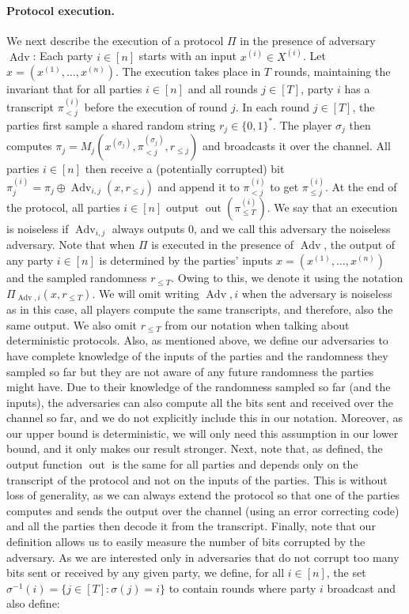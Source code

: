 \documentclass[10pt,a4paper]{article}
\begin{document}
\paragraph{Protocol execution.} We next describe the execution of a protocol $\Pi$ in the presence of adversary $\operatorname{Adv}$: Each party $i\in[n]$ starts with an input $x^{(i)}\in X^{(i)}$. Let $x=(x^{(1)},\ldots,x^{(n)})$. The execution takes place in $T$ rounds, maintaining the invariant that for all parties $i\in[n]$ and all rounds $j\in[T]$, party $i$ has a transcript $\pi_{<j}^{(i)}$ before the execution of round $j$. In each round $j\in[T]$, the parties first sample a shared random string $r_j\in\{0,1\}^*$. The player $\sigma_j$ then computes $\pi_j=M_j(x^{(\sigma_j)},\pi_{<j}^{(\sigma_j)},r_{\le j})$ and broadcasts it over the channel. All parties $i\in[n]$ then receive a (potentially corrupted) bit $\pi_j^{(i)}=\pi_j\oplus\operatorname{Adv}_{i,j}(x,r_{\le j})$ and append it to $\pi_{<j}^{(i)}$ to get $\pi_{\le j}^{(i)}$. At the end of the protocol, all parties $i\in[n]$ output $\operatorname{out}(\pi_{\le T}^{(i)})$. We say that an execution is noiseless if $\operatorname{Adv}_{i,j}$ always outputs 0, and we call this adversary the noiseless adversary.
Note that when $\Pi$ is executed in the presence of $\operatorname{Adv}$, the output of any party $i\in[n]$ is determined by the parties' inputs $x=(x^{(1)},\ldots,x^{(n)})$ and the sampled randomness $r_{\le T}$. Owing to this, we denote it using the notation $\Pi_{\operatorname{Adv},i}(x,r_{\le T})$. We will omit writing $\operatorname{Adv},i$ when the adversary is noiseless as in this case, all players compute the same transcripts, and therefore, also the same output. We also omit $r_{\le T}$ from our notation when talking about deterministic protocols. Also, as mentioned above, we define our adversaries to have complete knowledge of the inputs of the parties and the randomness they sampled so far but they are not aware of any future randomness the parties might have. Due to their knowledge of the randomness sampled so far (and the inputs), the adversaries can also compute all the bits sent and received over the channel so far, and we do not explicitly include this in our notation. Moreover, as our upper bound is deterministic, we will only need this assumption in our lower bound, and it only makes our result stronger.
Next, note that, as defined, the output function $\operatorname{out}$ is the same for all parties and depends only on the transcript of the protocol and not on the inputs of the parties. This is without loss of generality, as we can always extend the protocol so that one of the parties computes and sends the output over the channel (using an error correcting code) and all the parties then decode it from the transcript. Finally, note that our definition allows us to easily measure the number of bits corrupted by the adversary. As we are interested only in adversaries that do not corrupt too many bits sent or received by any given party, we define, for all $i\in[n]$, the set $\sigma^{-1}(i)=\{j\in[T]:\sigma(j)=i\}$ to contain rounds where party $i$ broadcast and also define:
\end{document}
